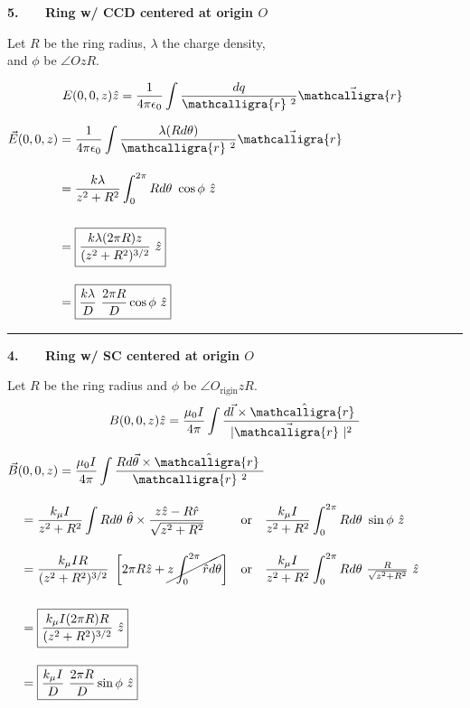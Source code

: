 \documentclass[12pt]{article}
\newcommand{\scripty}[1]{\ensuremath{\mathcalligra{#1}}}
\newcommand*{\cursrr}{\scripty{r}\ }
\begin{document}
\vspace{10pt}\noindent
\begin{minipage}[t]{.37\textwidth}
	\textbf{5. \ \ \ Ring w/ CCD centered at origin \(O\)}
	
	\vspace{10pt}
	Let \(R\) be the ring radius, \(\lambda\) the charge density, \\[7pt]
	and \(\phi\) be \(\angle OzR\).

	\vspace{5pt}
	\[ \displaystyle E(0,0,z) \hat{z} = \frac{1}{4 \pi \epsilon_0} \int \frac{dq}{\cursrr^2} \vec{\cursrr}\]

	\vspace{10pt}
	\(\begin{aligned}
		\vec{E}(0,0,z) &= \frac{1}{4 \pi \epsilon_0} \int \frac{\lambda (R d\theta)}{\cursrr^2} \vec{\cursrr}\\[10pt]
		&= \frac{k \lambda}{z^2 + R^2} \int_0^{2\pi} Rd\theta\ \cos{\phi}\ \hat{z} \\[15pt]
		&= \boxed{ \frac{k \lambda (2\pi R) z}{(z^2 + R^2)^{3/2}}\ \hat{z} }\\[10pt]
		&= \boxed{ \frac{k \lambda}{D}\ \frac{2\pi R}{D} \cos{\phi}\ \hat{z}}
	\end{aligned}\)
\end{minipage}
\hspace{0.01\textwidth}
\rule[-438pt]{.5pt}{450pt}
\hspace{0.01\textwidth}
\begin{minipage}[t]{.57\textwidth}
	\textbf{4. \ \ \ Ring w/ SC centered at origin \(O\)}

	\vspace{10pt}
	Let \(R\) be the ring radius and \(\phi\) be \(\angle O_\text{rigin}zR\).
	\[ \displaystyle B(0,0,z) \hat{z} = \frac{\mu_0 I}{4 \pi} 
			\int \frac{ d\vec{l} \times \hat{\cursrr} }{| \vec{\cursrr} |^2} \]

	\vspace{5pt}
	\(\begin{aligned} 
		&\vec{B}(0,0,z) = \frac{\mu_0 I}{4 \pi} \int \frac{R d\vec{\theta} \times \hat{\cursrr}}{\cursrr^2}\\[10pt]
		&\ \ \ \begin{aligned}
			&= \frac{k_\mu I}{z^2 + R^2} \int R d\theta \ \hat{\theta} \times \frac{z\hat{z}-R\hat{r}}{\sqrt{z^2 + R^2}} 
				&&\text{or}\quad 
				\frac{k_\mu I}{z^2 + R^2} \int_0^{2\pi} R d\theta \ \sin{\phi}\ \hat{z}\\[10pt]
			&= \frac{k_\mu I R}{ (z^2 + R^2)^{3/2} } \ 
				\left[ 2 \pi R \hat{z} + \cancel{z \int_0^{2 \pi} \hat{r} d\theta} \right] 
				&&\text{or}\quad 
				\frac{k_\mu I}{z^2 + R^2} \int_0^{2\pi} R d\theta \ \tfrac{R}{\sqrt{z^2 + R^2}}\ \hat{z}\\[15pt]
			&= \boxed{ \frac{k_\mu I(2\pi R)R}{ (z^2 + R^2)^{3/2} } \ \hat{z} }\\[10pt]
			&= \boxed{ \frac{k_\mu I}{D}\ \frac{2\pi R}{D} \sin{\phi}\ \hat{z} }
		\end{aligned}
	\end{aligned}\)
\end{minipage}
\end{document}

